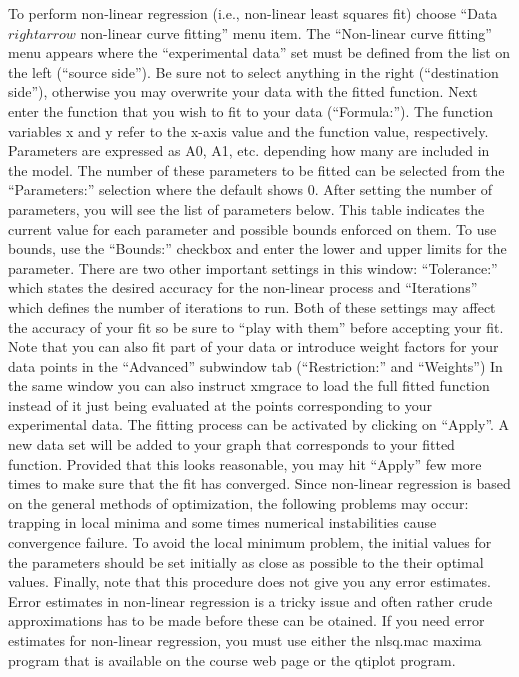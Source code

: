 \documentclass[byrevtex,amssymb,aps,pra,floatfix,letterpaper]{revtex4}
\begin{document}
To perform non-linear regression (i.e., non-linear least squares fit) choose ``Data $rightarrow$ non-linear curve fitting'' menu item. The ``Non-linear curve fitting'' menu appears where the ``experimental data'' set must be defined from the list on the left (``source side''). Be sure not to select anything in the right (``destination side''), otherwise you may overwrite your data with the fitted function. Next enter the function that you wish to fit to your data (``Formula:''). The function variables x and y refer to the x-axis value and the function value, respectively. Parameters are expressed as A0, A1, etc. depending how many are included in the model. The number of these parameters to be fitted can be selected from the ``Parameters:'' selection where the default shows 0. After setting the number of parameters, you will see the list of parameters below. This table indicates the current value for each parameter and possible bounds enforced on them. To use bounds, use the ``Bounds:'' checkbox and enter the lower and upper limits for the parameter. There are two other important settings in this window: ``Tolerance:'' which states the desired accuracy for the non-linear process and ``Iterations'' which defines the number of iterations to run. Both of these settings may affect the accuracy of your fit so be sure to ``play with them'' before accepting your fit. Note that you can also fit part of your data or introduce weight factors for your data points in the ``Advanced'' subwindow tab (``Restriction:'' and ``Weights'')  In the same window you can also instruct xmgrace to load the full fitted function instead of it just being evaluated at the points corresponding to your experimental data. The fitting process can be activated by clicking on ``Apply''. A new data set will be added to your graph that corresponds to your fitted function. Provided that this looks reasonable, you may hit ``Apply'' few more times to make sure that the fit has converged. Since non-linear regression is based on the general methods of optimization, the following problems may occur: trapping in local minima and some times numerical instabilities cause convergence failure. To avoid the local minimum problem, the initial values for the parameters should be set initially as close as possible to the their optimal values. Finally, note that this procedure does not give you any error estimates. Error estimates in non-linear regression is a tricky issue and often rather crude approximations has to be made before these can be otained. If you need error estimates for non-linear regression, you must use either the nlsq.mac maxima program that is available on the course web page or the qtiplot program.
\end{document}
